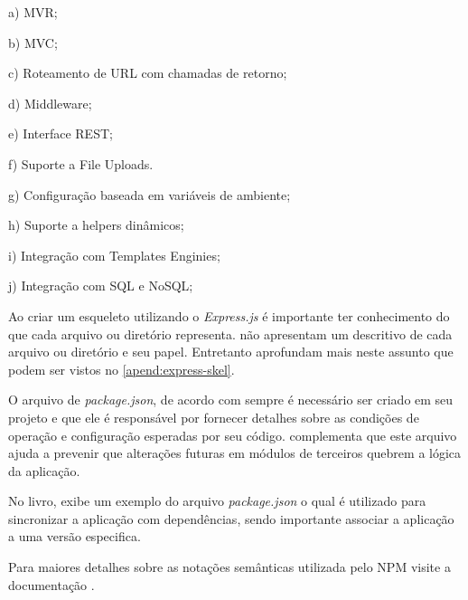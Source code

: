   \begin{compactitem}
    \item[a)] \ac{MVR};   
    
    \item[b)] \ac{MVC};
    
    \item[c)] Roteamento de \ac{URL} com chamadas de retorno;
    
    \item[d)] Middleware;
    
    \item[e)] Interface \ac{REST};
    
    \item[f)] Suporte a File Uploads.
    
    \item[g)] Configuração baseada em variáveis de ambiente;
    
    \item[h)] Suporte a helpers dinâmicos;
    
    \item[i)] Integração com Templates Enginies;
    
    \item[j)] Integração com SQL e NoSQL;
    
  \end{compactitem}
  
  Ao criar um esqueleto utilizando o \textit{Express.js} é importante ter conhecimento do que cada
  arquivo ou diretório representa. \cite{Powers:2012, Hughes:2012} não apresentam um descritivo de cada arquivo 
  ou diretório e seu papel. Entretanto \cite{Pereira:2013, Wilson:2013} aprofundam mais neste assunto que podem ser vistos
  no \ref{apend:express-skel}.
  
  O arquivo de \textit{package.json}, de acordo com  sempre é necessário ser criado 
  em seu projeto e que ele é responsável por fornecer detalhes sobre as condições de operação e configuração 
  esperadas por seu código. \cite{Wilson:2013} complementa que este arquivo ajuda a prevenir que alterações 
  futuras em módulos de terceiros quebrem a lógica da aplicação.

  No livro, \cite{Wilson:2013} exibe um exemplo do arquivo 
  \textit{package.json} o qual é utilizado para sincronizar a aplicação com dependências, sendo importante associar 
  a aplicação a uma versão especifica. 
  
  Para maiores detalhes sobre as notações semânticas utilizada pelo \ac{NPM} visite a documentação \cite{Semver:2013}.

